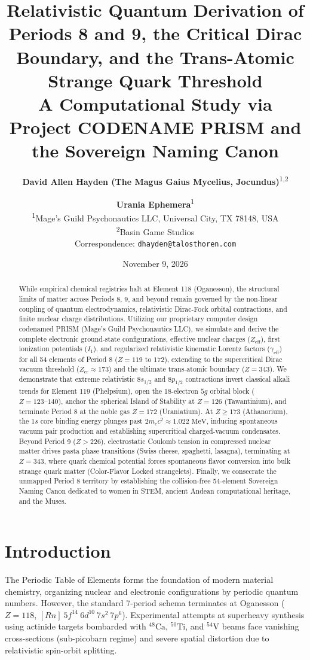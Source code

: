 \documentclass[10pt,twocolumn,a4paper]{article}
\title{\textbf{Relativistic Quantum Derivation of Periods 8 and 9, the Critical Dirac Boundary, and the Trans-Atomic Strange Quark Threshold}\\
\large A Computational Study via Project CODENAME PRISM and the Sovereign Naming Canon}
\author{
\textbf{David Allen Hayden (The Magus Gaius Mycelius, Jocundus)}\textsuperscript{1,2} \and \textbf{Urania Ephemera}\textsuperscript{1}\\
\small \textsuperscript{1}Mage's Guild Psychonautics LLC, Universal City, TX 78148, USA\\
\small \textsuperscript{2}Basin Game Studios\\
\small Correspondence: \texttt{dhayden@talosthoren.com}
}
\date{November 9, 2026}
\begin{document}
\maketitle

\begin{abstract}
While empirical chemical registries halt at Element 118 (Oganesson), the structural limits of matter across Periods 8, 9, and beyond remain governed by the non-linear coupling of quantum electrodynamics, relativistic Dirac-Fock orbital contractions, and finite nuclear charge distributions. Utilizing our proprietary computer design codenamed PRISM (Mage's Guild Psychonautics LLC), we simulate and derive the complete electronic ground-state configurations, effective nuclear charges ($Z_{\text{eff}}$), first ionization potentials ($I_1$), and regularized relativistic kinematic Lorentz factors ($\gamma_{\text{eff}}$) for all 54 elements of Period 8 ($Z = 119\text{ to }172$), extending to the supercritical Dirac vacuum threshold ($Z_{\text{cr}} \approx 173$) and the ultimate trans-atomic boundary ($Z = 343$). We demonstrate that extreme relativistic $8s_{1/2}$ and $8p_{1/2}$ contractions invert classical alkali trends for Element 119 (Phelpsium), open the 18-electron $5g$ orbital block ($Z = 123\text{--}140$), anchor the spherical Island of Stability at $Z = 126$ (Tawantinium), and terminate Period 8 at the noble gas $Z = 172$ (Uraniatium). At $Z \ge 173$ (Athanorium), the $1s$ core binding energy plunges past $2m_e c^2 \approx 1.022\text{ MeV}$, inducing spontaneous vacuum pair production and establishing supercritical charged-vacuum condensates. Beyond Period 9 ($Z > 226$), electrostatic Coulomb tension in compressed nuclear matter drives pasta phase transitions (Swiss cheese, spaghetti, lasagna), terminating at $Z = 343$, where quark chemical potential forces spontaneous flavor conversion into bulk strange quark matter (Color-Flavor Locked strangelets). Finally, we consecrate the unmapped Period 8 territory by establishing the collision-free 54-element Sovereign Naming Canon dedicated to women in STEM, ancient Andean computational heritage, and the Muses.
\end{abstract}

\section{Introduction}
The Periodic Table of Elements forms the foundation of modern material chemistry, organizing nuclear and electronic configurations by periodic quantum numbers. However, the standard 7-period schema terminates at Oganesson ($Z = 118$, $[Rn]\ 5f^{14}\ 6d^{10}\ 7s^2\ 7p^6$). Experimental attempts at superheavy synthesis using actinide targets bombarded with $^{48}\text{Ca}$, $^{50}\text{Ti}$, and $^{54}\text{V}$ beams face vanishing cross-sections (sub-picobarn regime) and severe spatial distortion due to relativistic spin-orbit splitting.
\end{document}

